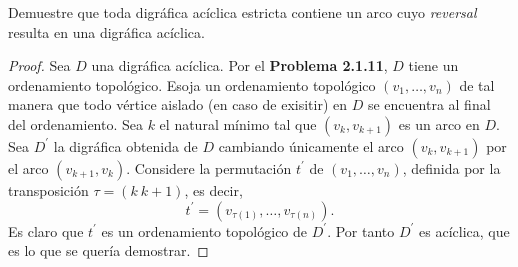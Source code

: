 \documentclass[12pt]{article}
\newenvironment{problem}[2][Problema]{\begin{trivlist}
\item[\hskip \labelsep {\bfseries #1}\hskip \labelsep {\bfseries #2.}]}{\end{trivlist}}
\begin{document}

\newpage
\begin{problem}{2.1.12}
Demuestre que toda digráfica acíclica estricta contiene un arco cuyo \textit{reversal} resulta en una digráfica acíclica. 
\end{problem}
\begin{proof}
Sea $D$ una digráfica acíclica. Por el \textbf{Problema 2.1.11}, $D$ tiene un ordenamiento topológico. Esoja un ordenamiento topológico $(v_1, \ldots, v_n)$ de tal manera que todo vértice aislado (en caso de exisitir) en $D$ se encuentra al final del ordenamiento. Sea $k$ el natural mínimo tal que $(v_k, v_{k+1})$ es un arco en $D.$ Sea $D^\prime$ la digráfica obtenida de $D$ cambiando únicamente el arco $(v_k, v_{k+1})$ por el arco $(v_{k+1}, v_{k})$. Considere la permutación $t^\prime$ de  $(v_1, \ldots, v_n)$, definida por la transposición $\tau = (k \ k+1 )$, es decir, 
$$ t^\prime = (v_{\tau(1)}, \ldots, v_{\tau(n)} ).$$ Es claro que $t^\prime$ es un ordenamiento topológico de $D^\prime.$ Por tanto $D^\prime$ es acíclica, que es lo que se quería demostrar. 
\end{proof}
\end{document}
